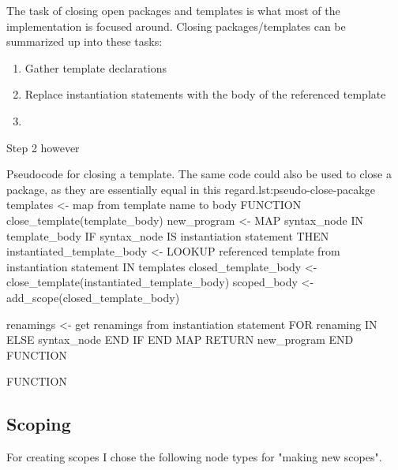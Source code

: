 The task of closing open packages and templates is what most of the implementation is focused around.
Closing packages/templates can be summarized up into these tasks:


\begin{enumerate}
    \item Gather template declarations
    \item Replace instantiation statements with the body of the referenced template
    \item 
\end{enumerate}

Step 2 however

\begin{code}{}{Pseudocode for closing a template. The same code could also be used to close a package, as they are essentially equal in this regard.}{lst:pseudo-close-pacakge}
    templates <- map from template name to body
    FUNCTION close_template(template_body)
        new_program <-
            MAP syntax_node IN template_body
                IF syntax_node IS instantiation statement THEN
                    instantiated_template_body <- LOOKUP referenced template from instantiation statement IN templates
                    closed_template_body <- close_template(instantiated_template_body)
                    scoped_body <- add_scope(closed_template_body)

                    renamings <- get renamings from instantiation statement
                    FOR renaming IN
                ELSE
                    syntax_node
                END IF
            END MAP
        RETURN new_program
    END FUNCTION

    FUNCTION
\end{code}

\subsection{Scoping}\label{subsec:inst-scoping}

For creating scopes I chose the following node types for "making new scopes".

